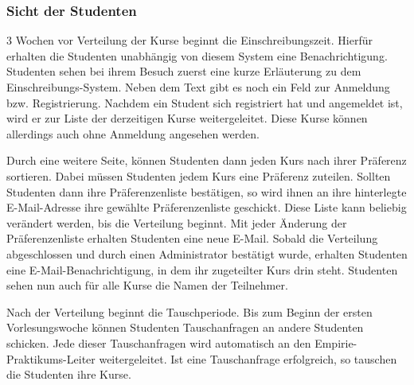 \documentclass[12pt,a4paper]{article}
\begin{document}
            \subsubsection{Sicht der Studenten}
            3 Wochen vor Verteilung der Kurse beginnt die Einschreibungszeit. Hierfür erhalten die Studenten unabhängig von diesem System eine Benachrichtigung.
            Studenten sehen bei ihrem Besuch zuerst eine kurze Erläuterung zu dem Einschreibungs-System. Neben dem Text gibt es noch ein Feld zur Anmeldung bzw. Registrierung.
            Nachdem ein Student sich registriert hat und angemeldet ist, wird er zur Liste der derzeitigen Kurse weitergeleitet. Diese Kurse können allerdings auch ohne Anmeldung angesehen werden. %
            
            Durch eine weitere Seite, können Studenten dann jeden Kurs nach ihrer Präferenz sortieren. Dabei müssen Studenten jedem Kurs eine Präferenz zuteilen. Sollten Studenten dann ihre Präferenzenliste bestätigen, so wird ihnen an ihre hinterlegte E-Mail-Adresse ihre gewählte Präferenzenliste geschickt. Diese Liste kann beliebig verändert werden, bis die Verteilung beginnt. Mit jeder Änderung der Präferenzenliste erhalten Studenten eine neue E-Mail. %
            Sobald die Verteilung abgeschlossen und durch einen Administrator bestätigt wurde, erhalten Studenten eine E-Mail-Benachrichtigung, in dem ihr zugeteilter Kurs drin steht.
            Studenten sehen nun auch für alle Kurse die Namen der Teilnehmer.
            
            Nach der Verteilung beginnt die Tauschperiode. Bis zum Beginn der ersten Vorlesungswoche können Studenten Tauschanfragen an andere Studenten schicken. Jede dieser Tauschanfragen wird automatisch an den Empirie-Praktikums-Leiter weitergeleitet.
            Ist eine Tauschanfrage erfolgreich, so tauschen die Studenten ihre Kurse.
    
\end{document}
